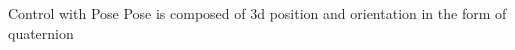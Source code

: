 \section{}
    \begin{frame}{Control with Pose}
        Pose is composed of 3d position and orientation in the form of quaternion
    \end{frame}
    
    \subsection{}
        
        
        
        
